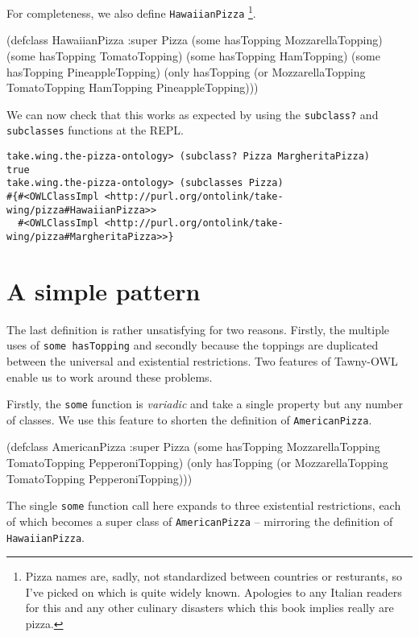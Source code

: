 For completeness, we also define \verb~HawaiianPizza~ \footnote{Pizza names are, sadly,
not standardized between countries or resturants, so I've picked on which is
quite widely known. Apologies to any Italian readers for this and any other
culinary disasters which this book implies really are pizza.}.

\begin{tawny}
(defclass HawaiianPizza
  :super
  Pizza
  (some hasTopping MozzarellaTopping)
  (some hasTopping TomatoTopping)
  (some hasTopping HamTopping)
  (some hasTopping PineappleTopping)
  (only hasTopping
        (or MozzarellaTopping TomatoTopping HamTopping PineappleTopping)))
\end{tawny}

We can now check that this works as expected by using the \verb~subclass?~ and
\verb~subclasses~ functions at the REPL.

\begin{verbatim}
take.wing.the-pizza-ontology> (subclass? Pizza MargheritaPizza)
true
take.wing.the-pizza-ontology> (subclasses Pizza)
#{#<OWLClassImpl <http://purl.org/ontolink/take-wing/pizza#HawaiianPizza>>
  #<OWLClassImpl <http://purl.org/ontolink/take-wing/pizza#MargheritaPizza>>}
\end{verbatim}

\section{A simple pattern}
\label{sec-5-6}

The last definition is rather unsatisfying for two reasons. Firstly, the
multiple uses of \verb~some hasTopping~ and secondly because the toppings are
duplicated between the universal and existential restrictions. Two features of
Tawny-OWL enable us to work around these problems. 

Firstly, the \verb~some~ function is \emph{variadic} and take a single property but any
number of classes. We use this feature to shorten the definition of
\verb~AmericanPizza~. 

\begin{tawny}
(defclass AmericanPizza
  :super
  Pizza
  (some hasTopping MozzarellaTopping
        TomatoTopping PepperoniTopping)
  (only hasTopping (or MozzarellaTopping TomatoTopping PepperoniTopping)))
\end{tawny}

The single \verb~some~ function call here expands to three existential
restrictions, each of which becomes a super class of \verb~AmericanPizza~ --
mirroring the definition of \verb~HawaiianPizza~.


